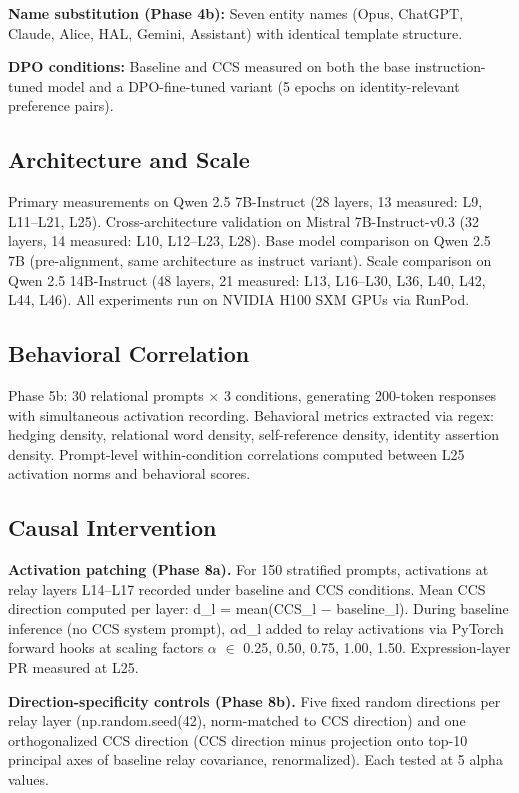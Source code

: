 \documentclass[11pt]{article}
\begin{document}
\textbf{Name substitution (Phase 4b):} Seven entity names (Opus, ChatGPT, Claude, Alice, HAL, Gemini, Assistant) with identical template structure.

\textbf{DPO conditions:} Baseline and CCS measured on both the base instruction-tuned model and a DPO-fine-tuned variant (5 epochs on identity-relevant preference pairs).

\subsection{Architecture and Scale}

Primary measurements on Qwen 2.5 7B-Instruct (28 layers, 13 measured: L9, L11–L21, L25). Cross-architecture validation on Mistral 7B-Instruct-v0.3 (32 layers, 14 measured: L10, L12–L23, L28). Base model comparison on Qwen 2.5 7B (pre-alignment, same architecture as instruct variant). Scale comparison on Qwen 2.5 14B-Instruct (48 layers, 21 measured: L13, L16–L30, L36, L40, L42, L44, L46). All experiments run on NVIDIA H100 SXM GPUs via RunPod.

\subsection{Behavioral Correlation}

Phase 5b: 30 relational prompts $\times$ 3 conditions, generating 200-token responses with simultaneous activation recording. Behavioral metrics extracted via regex: hedging density, relational word density, self-reference density, identity assertion density. Prompt-level within-condition correlations computed between L25 activation norms and behavioral scores.

\subsection{Causal Intervention}

\textbf{Activation patching (Phase 8a).} For 150 stratified prompts, activations at relay layers L14–L17 recorded under baseline and CCS conditions. Mean CCS direction computed per layer: d\_l = mean(CCS\_l $-$ baseline\_l). During baseline inference (no CCS system prompt), $\alpha$d\_l added to relay activations via PyTorch forward hooks at scaling factors $\alpha$ $\in$ {0.25, 0.50, 0.75, 1.00, 1.50}. Expression-layer PR measured at L25.

\textbf{Direction-specificity controls (Phase 8b).} Five fixed random directions per relay layer (np.random.seed(42), norm-matched to CCS direction) and one orthogonalized CCS direction (CCS direction minus projection onto top-10 principal axes of baseline relay covariance, renormalized). Each tested at 5 alpha values.
\end{document}
